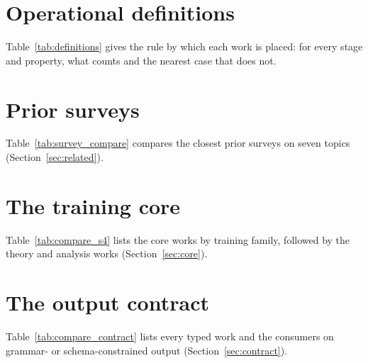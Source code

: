 \section{Operational definitions}
\renewcommand{\thetable}{A\arabic{table}}\setcounter{table}{0}   %
\label{app:definitions}

Table~\ref{tab:definitions} gives the rule by which each work is placed: for every stage and property, what
counts and the nearest case that does not.



\clearpage
\section{Prior surveys}
\renewcommand{\thetable}{B\arabic{table}}\setcounter{table}{0}   %
\label{app:surveys}

Table~\ref{tab:survey_compare} compares the \nSurveysCompared closest prior surveys on seven topics
(Section~\ref{sec:related}).



\clearpage
\section{The training core}
\renewcommand{\thetable}{C\arabic{table}}\setcounter{table}{0}   %
\label{app:core}

Table~\ref{tab:compare_s4} lists the \nCore core works by training family, followed by the \nTheory theory and
analysis works (Section~\ref{sec:core}).



\clearpage
\section{The output contract}
\renewcommand{\thetable}{D\arabic{table}}\setcounter{table}{0}   %
\label{app:contract}

Table~\ref{tab:compare_contract} lists every typed work and the consumers on grammar- or schema-constrained
output (Section~\ref{sec:contract}).



